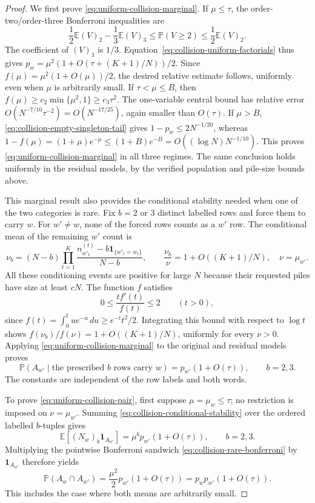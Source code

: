 \documentclass[11pt]{article}
\numberwithin{equation}{section}
\newcommand{\E}{\mathbb E}
\newcommand{\Pp}{\mathbb P}
\newcommand{\1}{\mathbf 1}
\begin{document}
\begin{proof}
We first prove \eqref{eq:uniform-collision-marginal}.
If $\mu\le\tau$, the order-two/order-three Bonferroni inequalities are
\begin{equation}
\label{eq:collision-rare-bonferroni}
 \frac12\E(V)_2-\frac13\E(V)_3
 \le\Pp(V\ge2)\le\frac12\E(V)_2.
\end{equation}
The coefficient of $(V)_3$ is $1/3$.
Equation~\eqref{eq:collision-uniform-factorials} thus gives
$p_w=\mu^2(1+O(\tau+(K+1)/N))/2$.
Since $f(\mu)=\mu^2(1+O(\mu))/2$, the desired relative estimate follows,
uniformly even when $\mu$ is arbitrarily small.
If $\tau<\mu\le B$, then $f(\mu)\ge c_2\min\{\mu^2,1\}\ge c_3\tau^2$.
The one-variable central bound has relative error
$O(N^{-7/10}\tau^{-2})=O(N^{-17/25})$, again smaller than $O(\tau)$.
If $\mu>B$, \eqref{eq:collision-empty-singleton-tail} gives
$1-p_w\le2N^{-1/20}$, whereas
$1-f(\mu)=(1+\mu)e^{-\mu}\le(1+B)e^{-B}=O((\log N)N^{-1/10})$.
This proves \eqref{eq:uniform-collision-marginal} in all three regimes.
The same conclusion holds uniformly in the residual models, by the verified
population and pile-size bounds above.

This marginal result also provides the conditional stability needed when
one of the two categories is rare. Fix $b=2$ or $3$ distinct labelled rows
and force them to carry $w$. For $w'\ne w$, none of the forced rows counts
as a $w'$ row. The conditional mean of the remaining $w'$ count is
\[
 \nu_b=(N-b)\prod_{t=1}^{K}
 \frac{n_{w'_t}^{(t)}-b\1_{\{w'_t=w_t\}}}{N-b},
 \qquad \frac{\nu_b}{\nu}=1+O((K+1)/N),\quad\nu=\mu_{w'}.
\]
All these conditioning events are positive for large $N$ because their
requested piles have size at least $cN$. The function $f$ satisfies
\[
 0\le\frac{tf'(t)}{f(t)}\le2\qquad(t>0),
\]
since $f(t)=\int_0^t u e^{-u}\,du\ge e^{-t}t^2/2$.
Integrating this bound with respect to $\log t$ shows
$f(\nu_b)/f(\nu)=1+O((K+1)/N)$, uniformly for every $\nu>0$.
Applying \eqref{eq:uniform-collision-marginal} to the original and residual
models proves
\begin{equation}
\label{eq:collision-conditional-stability}
 \Pp(A_{w'}\mid\text{the prescribed $b$ rows carry $w$})
 =p_{w'}(1+O(\tau)),\qquad b=2,3.
\end{equation}
The constants are independent of the row labels and both words.

To prove \eqref{eq:uniform-collision-pair}, first suppose
$\mu=\mu_w\le\tau$; no restriction is imposed on $\nu=\mu_{w'}$.
Summing \eqref{eq:collision-conditional-stability} over the ordered labelled
$b$-tuples gives
\[
 \E[(N_w)_b\1_{A_{w'}}]
 =\mu^b p_{w'}(1+O(\tau)),\qquad b=2,3.
\]
Multiplying the pointwise Bonferroni sandwich
\eqref{eq:collision-rare-bonferroni} by $\1_{A_{w'}}$ therefore yields
\[
 \Pp(A_w\cap A_{w'})=\frac{\mu^2}2p_{w'}(1+O(\tau))
 =p_wp_{w'}(1+O(\tau)).
\]
This includes the case where both means are arbitrarily small.


\end{proof}
\end{document}
